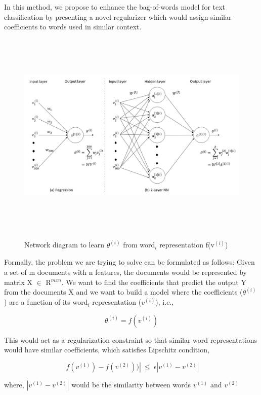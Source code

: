 In this method, we propose to enhance the bag-of-words model for text classification by presenting a novel regularizer which would assign similar coefficients to words used in similar context.

\begin{figure}
\centering
\includegraphics[width=18cm, height=10cm]{fig1.jpg}\\
\centering
\caption{Network diagram to learn $\theta^{(i)}$ from word$_{i}$ representation f(v$^{(i)}$)}
\label{fig:foo}
\end{figure}

Formally, the problem we are trying to solve can be formulated as follows: Given a set of m documents with n features, the documents would be represented by matrix X $\in$ R$^{m x n}$. We want to find the coefficients that predict the output Y from the documents X and we want to build a model where the coefficients ($\theta^{(i)}$) are a function of its word$_{i}$ representation ($v^{(i)}$), i.e.,

\begin{equation}\label{lb1}
\theta^{(i)} = f(v^{(i)})
\end{equation}

This would act as a regularization constraint so that similar word representations would have similar coefficients, which satisfies Lipschitz condition,

\begin{equation}
|f(v^{(1)}) - f(v^{(2)}))|\ \leq\ \epsilon|v^{(1)}-v^{(2)}|
\end{equation}

where, $|v^{(1)}-v^{(2)}|$ would be the similarity between words $v^{(1)}$ and $v^{(2)}$


